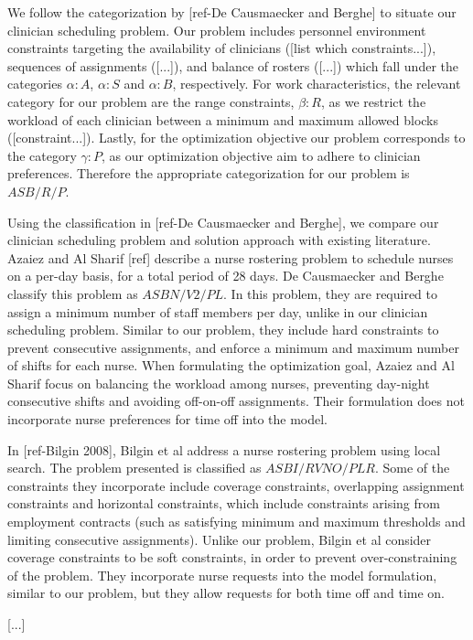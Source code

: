 We follow the categorization by [ref-De Causmaecker and Berghe] to situate our clinician
scheduling problem. Our problem includes 
personnel environment constraints targeting the availability of clinicians
([list which constraints...]),
sequences of assignments ([...]), and balance of rosters ([...]) 
which fall under the categories $\alpha : A$, $\alpha : S$ and $\alpha : B$,  %
respectively. 
For work characteristics, the relevant category for our problem are the range
constraints, $\beta : R$, 
as we restrict the workload of each clinician between a minimum and maximum
allowed blocks ([constraint...]).
Lastly, for the optimization objective our problem corresponds to the category
$\gamma : P$, as our optimization objective
aim to adhere to clinician preferences. Therefore the appropriate categorization
for our problem is $ASB/R/P$.

Using the classification in [ref-De Causmaecker and Berghe], we compare our clinician  %
scheduling problem and solution approach with existing literature. Azaiez and Al Sharif [ref]
describe a nurse rostering problem to schedule nurses on a per-day basis, for a total period
of 28 days. De Causmaecker and Berghe classify this problem as $ASBN/V2/PL$.
In this problem, they are required to assign a minimum number of staff members
per day, unlike in our clinician scheduling problem. Similar to our problem, they include  %
hard constraints to prevent consecutive assignments, and enforce a minimum and maximum 
number of shifts for each nurse. When formulating the optimization goal, Azaiez and Al Sharif
focus on balancing the workload among nurses, preventing day-night consecutive shifts and avoiding
off-on-off assignments. Their formulation does not incorporate nurse preferences
for time off into the model. 

In [ref-Bilgin 2008], Bilgin et al address a nurse rostering problem using local search. 
The problem presented is classified as $ASBI/RVNO/PLR$.  %
Some of the constraints they incorporate include coverage constraints, overlapping assignment  %
constraints and horizontal constraints, which include constraints arising from employment contracts
(such as satisfying minimum and maximum thresholds and limiting consecutive assignments). Unlike
our problem, Bilgin et al consider coverage constraints to be soft constraints, in order to prevent
over-constraining of the problem. They incorporate nurse requests into the model formulation,  %
similar to our problem, but they allow requests for both time off and time on.   %

[...]
